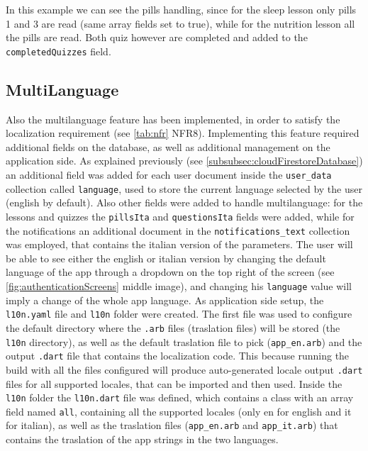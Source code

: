 \noindent In this example we can see the pills handling, since for the sleep lesson only pills 1 and 3 are read (same array fields set to true), while for the nutrition lesson all the pills are read. Both quiz however are completed and added to the \texttt{completedQuizzes} field.
\subsection{MultiLanguage}
Also the multilanguage feature has been implemented, in order to satisfy the localization requirement (see \cref{tab:nfr} NFR8). Implementing this feature required additional fields on the database, as well as additional management on the application side. 
As explained previously (see \cref{subsubsec:cloudFirestoreDatabase}) an additional field was added for each user document inside the \texttt{user\_data} collection called \texttt{language}, used to store the current language selected by the user (english by default). Also other fields were added to handle multilanguage: for the lessons and quizzes the \texttt{pillsIta} and \texttt{questionsIta} fields were added, while for the notifications an additional document in the \texttt{notifications\_text} collection was employed, that contains the italian version of the parameters. The user will be able to see either the english or italian version by changing the default language of the app through a dropdown on the top right of the screen (see \cref{fig:authenticationScreens} middle image), and changing his \texttt{language} value will imply a change of the whole app language. 
\newline As application side setup, the \texttt{l10n.yaml} file and \texttt{l10n} folder were created. The first file was used to configure the default directory where the \texttt{.arb} files (traslation files) will be stored (the \texttt{l10n} directory), as well as the default traslation file to pick (\texttt{app\_en.arb}) and the output \texttt{.dart} file that contains the localization code. This because running the build with all the files configured will produce auto-generated locale output \texttt{.dart} files for all supported locales, that can be imported and then used. Inside the \texttt{l10n} folder the \texttt{l10n.dart} file was defined, which contains a class with an array field named \texttt{all}, containing all the supported locales (only en for english and it for italian), as well as the traslation files (\texttt{app\_en.arb} and \texttt{app\_it.arb}) that contains the traslation of the app strings in the two languages.
